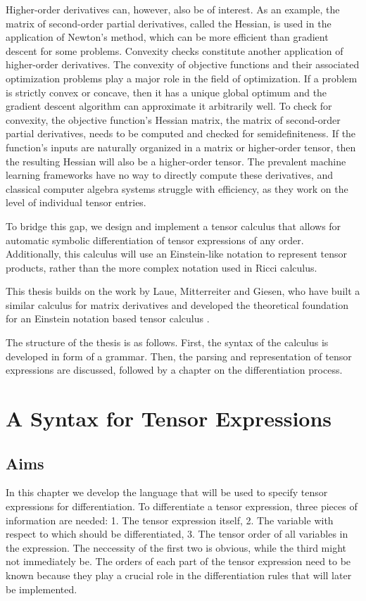 \documentclass[12pt, a4paper]{report}
\begin{document}
Higher-order derivatives can, however, also be of interest.
As an example, the matrix of second-order partial derivatives, called the Hessian, is used in the application of Newton's method, which can be more efficient than gradient descent for some problems.
Convexity checks constitute another application of higher-order derivatives.
The convexity of objective functions and their associated optimization problems play a major role in the field of optimization.
If a problem is strictly convex or concave, then it has a unique global optimum and the gradient descent algorithm can approximate it arbitrarily well.
To check for convexity, the objective function's Hessian matrix, the matrix of second-order partial derivatives, needs to be computed and checked for semidefiniteness.
If the function's inputs are naturally organized in a matrix or higher-order tensor, then the resulting Hessian will also be a higher-order tensor.
The prevalent machine learning frameworks have no way to directly compute these derivatives, and classical computer algebra systems struggle with efficiency, as they work on the level of individual tensor entries.

To bridge this gap, we design and implement a tensor calculus that allows for automatic symbolic differentiation of tensor expressions of any order.
Additionally, this calculus will use an Einstein-like notation to represent tensor products, rather than the more complex notation used in Ricci calculus.

This thesis builds on the work by Laue, Mitterreiter and Giesen, who have built a similar calculus for matrix derivatives \cite{matrixpaper} and developed the theoretical foundation for an Einstein notation based tensor calculus \cite{tensorpaper}.

The structure of the thesis is as follows.
First, the syntax of the calculus is developed in form of a grammar.
Then, the parsing and representation of tensor expressions are discussed, followed by a chapter on the differentiation process.

\chapter{A Syntax for Tensor Expressions}
\section{Aims}
In this chapter we develop the language that will be used to specify tensor expressions for differentiation.
To differentiate a tensor expression, three pieces of information are needed: 1. The tensor expression itself, 2. The variable with respect to which should be differentiated, 3. The tensor order of all variables in the expression.
The neccessity of the first two is obvious, while the third might not immediately be.
The orders of each part of the tensor expression need to be known because they play a crucial role in the differentiation rules that will later be implemented.
\end{document}
